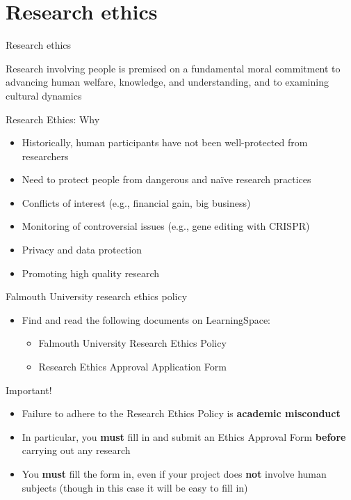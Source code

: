 \part{Research ethics}
\frame{\partpage}

\begin{frame}{Research ethics}
	
	Research involving people is premised on a fundamental moral commitment 
	to advancing human welfare, 
	knowledge, and understanding, and to examining cultural dynamics

\end{frame}

\begin{frame}{Research Ethics: Why}
	
	\begin{itemize}
		\pause\item Historically, human participants have not been well-protected from researchers
		\pause\item Need to protect people from dangerous and na\"ive research practices
		\pause\item Conflicts of interest (e.g., financial gain, big business)
		\pause\item Monitoring of controversial issues (e.g., gene editing with CRISPR)
		\pause\item Privacy and data protection
		\pause\item Promoting high quality research
	\end{itemize}
\end{frame}

\begin{frame}{Falmouth University research ethics policy}
	\begin{itemize}
		\item Find and read the following documents on LearningSpace:
		\begin{itemize}
			\item Falmouth University Research Ethics Policy
			\item Research Ethics Approval Application Form
		\end{itemize}
	\end{itemize}
\end{frame}

{
\iftoggle{printable}{
}{
	\setbeamercolor{background canvas}{bg=red!50!black}
}
\begin{frame}{Important!}
	\begin{itemize}
		\pause\item Failure to adhere to the Research Ethics Policy is \textbf{academic misconduct}
		\pause\item In particular, you \textbf{must} fill in and submit an Ethics Approval Form
			\textbf{before} carrying out any research
		\pause\item You \textbf{must} fill the form in, even if your project does \textbf{not} involve human subjects
			(though in this case it will be easy to fill in)
	\end{itemize}
\end{frame}
}

